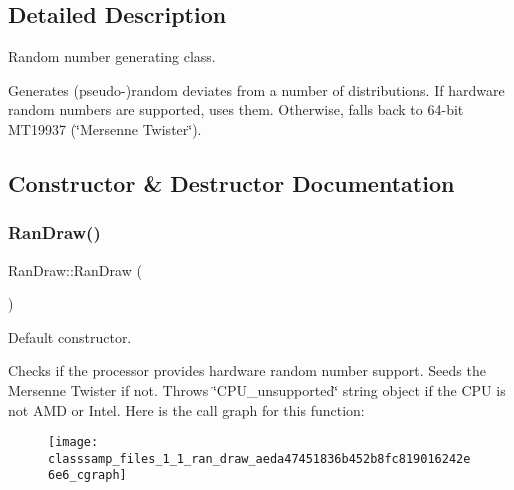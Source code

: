 \subsection{Detailed Description}
Random number generating class. 

Generates (pseudo-\/)random deviates from a number of distributions. If hardware random numbers are supported, uses them. Otherwise, falls back to 64-\/bit M\+T19937 (\char`\"{}\+Mersenne Twister\char`\"{}). 

\subsection{Constructor \& Destructor Documentation}
\mbox{\label{classsamp_files_1_1_ran_draw_aeda47451836b452b8fc819016242e6e6}} 
\subsubsection{\texorpdfstring{Ran\+Draw()}{RanDraw()}\hspace{0.1cm}{\footnotesize\ttfamily [1/3]}}
{\footnotesize\ttfamily Ran\+Draw\+::\+Ran\+Draw (\begin{DoxyParamCaption}{ }\end{DoxyParamCaption})}



Default constructor. 

Checks if the processor provides hardware random number support. Seeds the Mersenne Twister if not. Throws \char`\"{}\+C\+P\+U\+\_\+unsupported\char`\"{} string object if the C\+PU is not A\+MD or Intel. Here is the call graph for this function\+:\nopagebreak
\begin{figure}[H]
\begin{center}
\leavevmode
\texttt{[image: classsamp\_files\_1\_1\_ran\_draw\_aeda47451836b452b8fc819016242e6e6\_cgraph]}
\end{center}
\end{figure}
\mbox{\label{classsamp_files_1_1_ran_draw_aaf6e8bd21e654a9c53b024b36f83149f}} 
